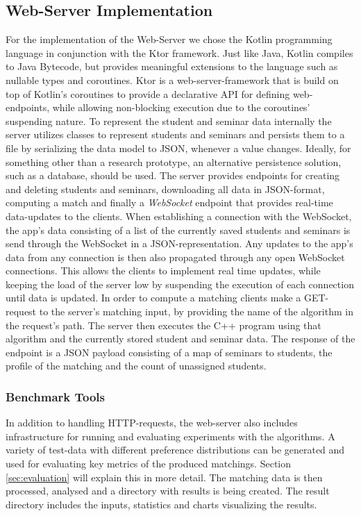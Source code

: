 \subsection{Web-Server Implementation}
For the implementation of the Web-Server we chose the Kotlin programming language in conjunction with the Ktor framework. Just like Java, Kotlin compiles to Java Bytecode, but provides meaningful extensions to the language such as nullable types and coroutines. Ktor is a web-server-framework that is build on top of Kotlin's coroutines to provide a declarative API for defining web-endpoints, while allowing non-blocking execution due to the coroutines' suspending nature. 
To represent the student and seminar data internally the server utilizes classes to represent students and seminars and persists them to a file by serializing the data model to JSON, whenever a value changes. Ideally, for something other than a research prototype, an alternative persistence solution, such as a database, should be used. The server provides endpoints for creating and deleting students and seminars, downloading all data in JSON-format, computing a match and finally a \emph{WebSocket} endpoint that provides real-time data-updates to the clients. When establishing a connection with the WebSocket, the app's data consisting of a list of the currently saved students and seminars is send through the WebSocket in a JSON-representation. Any updates to the app's data from any connection is then also propagated through any open WebSocket connections. This allows the clients to implement real time updates, while keeping the load of the server low by suspending the execution of each connection until data is updated. In order to compute a matching clients make a GET-request to the server's matching input, by providing the name of the algorithm in the request's path. The server then executes the C++ program using that algorithm and the currently stored student and seminar data. The response of the endpoint is a JSON payload consisting of a map of seminars to students, the profile of the matching and the count of unassigned students.

\subsubsection{Benchmark Tools}
In addition to handling HTTP-requests, the web-server also includes infrastructure for running and evaluating experiments with the algorithms. A variety of test-data with different preference distributions can be generated and used for evaluating key metrics of the produced matchings. Section \ref{sec:evaluation} will explain this in more detail. The matching data is then processed, analysed and a directory with results is being created. The result directory includes the inputs, statistics and charts visualizing the results.  

